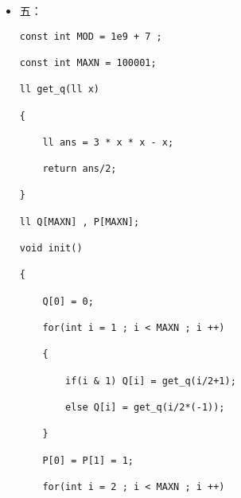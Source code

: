 \documentclass[E:/GsjzTle/main/main.tex]{subfiles}
\begin{document}
\begin{itemize}
\begin{lstlisting}
{

    int n = 1e5;

    dp[0] = 1;

    for (int i = 1; i <= n; ++i)

    {

        for (int j = 1, tmp = 1; i >= (3  * j * j - j) / 2 ; ++ j , tmp *= -1)

        {

            int x = (3 * j * j - j) / 2;

            int y = (3 * j * j + j) / 2;

            dp[i] = ((dp[i] + tmp * dp[i - x]) % mo + mo) % mo;

            if (i >= y) dp[i] = ((dp[i] + tmp * dp[i - y]) % mo + mo) % mo;

        }

    }

    int T = 1; cin >> T;

    while (T--)

    {

        int n ; cin >> n;

        cout << dp[n] << '\n';

    }

    return 0;

}
\end{lstlisting}
\item
  五：

\begin{lstlisting}
const int MOD = 1e9 + 7 ;

const int MAXN = 100001;

ll get_q(ll x)

{

	ll ans = 3 * x * x - x;

	return ans/2;

}

ll Q[MAXN] , P[MAXN];

void init()

{

	Q[0] = 0;

	for(int i = 1 ; i < MAXN ; i ++)

	{

		if(i & 1) Q[i] = get_q(i/2+1);

		else Q[i] = get_q(i/2*(-1));

	}

	P[0] = P[1] = 1;

	for(int i = 2 ; i < MAXN ; i ++)


\end{lstlisting}
\end{itemize}
\end{document}
